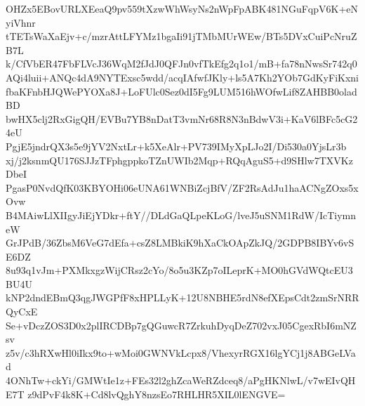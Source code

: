 OHZx5EBovURLXEeaQ9pv559tXzwWhWsyNs2nWpFpABK481NGuFqpV6K+eNyiVhnr
tTETsWaXaEjv+c/mzrAttLFYMz1bgaIi91jTMbMUrWEw/BTs5DVxCuiPcNruZB7L
k/CfVbER47FbFLVcJ36WqM2fJdJ0QFJn0vfTkEfg2q1o1/mB+fa78nNwsSr742q0
AQi4luii+ANQc4dA9NYTExsc5wdd/acqIAfwfJKly+ls5A7Kh2YOb7GdKyFiKxni
fbaKFnbHJQWePYOXa8J+LoFUlc0Sez0dI5Fg9LUM516hWOfwLif8ZAHBB0oladBD
bwHX5clj2RxGigQH/EVBu7YB8nDatT3vmNr68R8N3nBdwV3i+KaV6lBFc5cG24eU
PgjE5jndrQX3s5e9jYV2NxtLr+k5XeAlr+PV739IMyXpLJo2I/Di530a0YjsLr3b
xj/j2ksnmQU176SJJzTFphgppkoTZnUWIb2Mqp+RQqAguS5+d9SHlw7TXVKzDbeI
PgasP0NvdQfK03KBYOHi06eUNA61WNBiZcjBfV/ZF2RsAdJu1haACNgZOxs5xOvw
B4MAiwLlXIIgyJiEjYDkr+ftY//DLdGaQLpeKLoG/lveJ5uSNM1RdW/IcTiymneW
GrJPdB/36ZbsM6VeG7dEfa+csZ8LMBkiK9hXaCkOApZkJQ/2GDPB8IBYv6vSE6DZ
8u93q1vJm+PXMkxgzWijCRsz2cYo/8o5u3KZp7oILeprK+MO0hGVdWQtcEU3BU4U
kNP2dndEBmQ3qgJWGPfF8xHPLLyK+12U8NBHE5rdN8efXEpsCdt2zmSrNRRQyCxE
Se+vDczZOS3D0x2plIRCDBp7gQGuwcR7ZrkuhDyqDeZ702vxJ05CgexRbI6mNZsv
z5v/c3hRXwHl0iIkx9to+wMoi0GWNVkLcpx8/VhexyrRGX16lgYCj1j8ABGeLVad
4ONhTw+ckYi/GMWtIe1z+FEs32l2ghZcaWeRZdceq8/aPgHKNlwL/v7wEIvQHE7T
z9dPvF4k8K+Cd8lvQghY8nzsEo7RHLHR5XIL0lENGVE=

